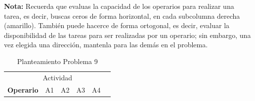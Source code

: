 \documentclass[12pt]{article}  %
\begin{document}
\textbf{Nota:} Recuerda que evaluas la capacidad de los operarios para realizar una tarea, es decir, buscas ceros de forma horizontal, en cada subcolumna derecha (amarillo).
También puede hacerce de forma ortogonal, es decir, evaluar la disponibilidad de las tareas para ser realizadas por un operario; sin embargo, una vez elegida una dirección, mantenla para las demás en el problema.

\begin{table}[H]
\centering
\caption{Planteamiento Problema 9}
\label{tab:Prob9}
\begin{tabular}{cccccccccccccc}
\multicolumn{14}{c}{Actividad}                                                                                                                                                                                                                                                                                                                                                                                                                                                                                                                                                                                                                                                                                                                                                                                                                                                                                                                            \\ \cline{2-13}
\multicolumn{1}{c|}{\textbf{Operario}} & \multicolumn{3}{c|}{A1}                                                                                                                                                                                             & \multicolumn{3}{c|}{A2}                                                                                                                                                                                             & \multicolumn{3}{c|}{A3}                                                                                                                                                                                             & \multicolumn{3}{c|}{A4}                                                                                                                                                                                             & \multicolumn{1}{l}{}     \\ \cline{2-13}

\end{tabular}
\end{table}
\end{document}

